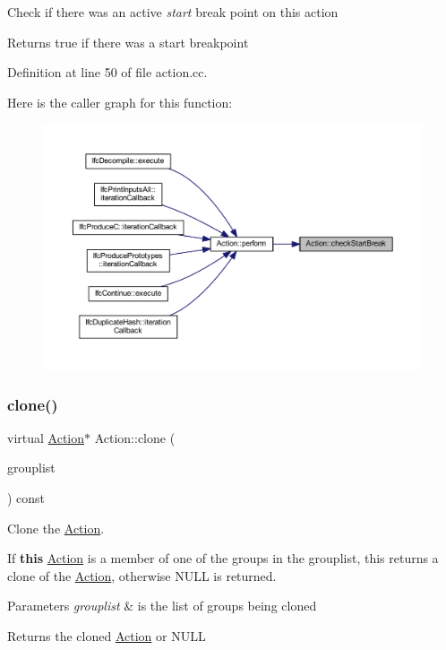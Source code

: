 Check if there was an active {\itshape start} break point on this action \begin{DoxyReturn}{Returns}
true if there was a start breakpoint 
\end{DoxyReturn}


Definition at line 50 of file action.\+cc.

Here is the caller graph for this function\+:
\nopagebreak
\begin{figure}[H]
\begin{center}
\leavevmode
\includegraphics[width=350pt]{class_action_a2b657446cbd46f656b1d9f2dcbb1f4dc_icgraph}
\end{center}
\end{figure}
\mbox{\label{class_action_af8242e41d09e5df52f97df9e65cc626f}} 
\subsubsection{\texorpdfstring{clone()}{clone()}}
{\footnotesize\ttfamily virtual \mbox{\hyperlink{class_action}{Action}}$\ast$ Action\+::clone (\begin{DoxyParamCaption}\item[{const \mbox{\hyperlink{class_action_group_list}{Action\+Group\+List}} \&}]{grouplist }\end{DoxyParamCaption}) const\hspace{0.3cm}{\ttfamily [pure virtual]}}



Clone the \mbox{\hyperlink{class_action}{Action}}. 

If {\bfseries{this}} \mbox{\hyperlink{class_action}{Action}} is a member of one of the groups in the grouplist, this returns a clone of the \mbox{\hyperlink{class_action}{Action}}, otherwise N\+U\+LL is returned. 
\begin{DoxyParams}{Parameters}
{\em grouplist} & is the list of groups being cloned \\
\hline
\end{DoxyParams}
\begin{DoxyReturn}{Returns}
the cloned \mbox{\hyperlink{class_action}{Action}} or N\+U\+LL 
\end{DoxyReturn}


